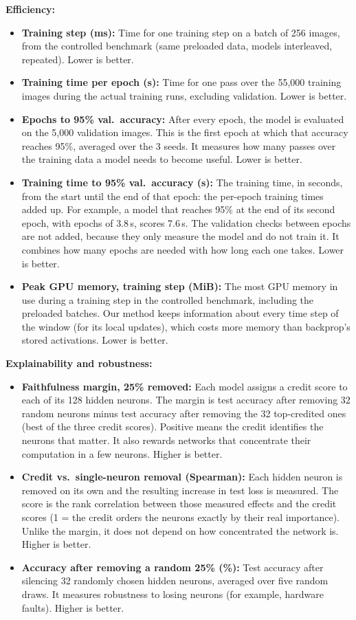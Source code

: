 \documentclass{article}
\begin{document}
{\noindent\textbf{Efficiency:}
\begin{itemize}
  \item \textbf{Training step (ms):} Time for one training step on a batch of 256 images, from the controlled benchmark (same preloaded data, models interleaved, repeated). Lower is better.
  \item \textbf{Training time per epoch (s):} Time for one pass over the 55,000 training images during the actual training runs, excluding validation. Lower is better.
  \item \textbf{Epochs to 95\% val.\ accuracy:} After every epoch, the model is evaluated on the 5,000 validation images. This is the first epoch at which that accuracy reaches 95\%, averaged over the 3 seeds. It measures how many passes over the training data a model needs to become useful. Lower is better.
  \item \textbf{Training time to 95\% val.\ accuracy (s):} The training time, in seconds, from the start until the end of that epoch: the per-epoch training times added up. For example, a model that reaches 95\% at the end of its second epoch, with epochs of 3.8\,s, scores 7.6\,s. The validation checks between epochs are not added, because they only measure the model and do not train it. It combines how many epochs are needed with how long each one takes. Lower is better.
  \item \textbf{Peak GPU memory, training step (MiB):} The most GPU memory in use during a training step in the controlled benchmark, including the preloaded batches. Our method keeps information about every time step of the window (for its local updates), which costs more memory than backprop's stored activations. Lower is better.
\end{itemize}

\noindent\textbf{Explainability and robustness:}
\begin{itemize}
  \item \textbf{Faithfulness margin, 25\% removed:} Each model assigns a credit score to each of its 128 hidden neurons. The margin is test accuracy after removing 32 random neurons minus test accuracy after removing the 32 top-credited ones (best of the three credit scores). Positive means the credit identifies the neurons that matter. It also rewards networks that concentrate their computation in a few neurons. Higher is better.
  \item \textbf{Credit vs.\ single-neuron removal (Spearman):} Each hidden neuron is removed on its own and the resulting increase in test loss is measured. The score is the rank correlation between those measured effects and the credit scores (1 = the credit orders the neurons exactly by their real importance). Unlike the margin, it does not depend on how concentrated the network is. Higher is better.
  \item \textbf{Accuracy after removing a random 25\% (\%):} Test accuracy after silencing 32 randomly chosen hidden neurons, averaged over five random draws. It measures robustness to losing neurons (for example, hardware faults). Higher is better.
\end{itemize}

}
\end{document}
